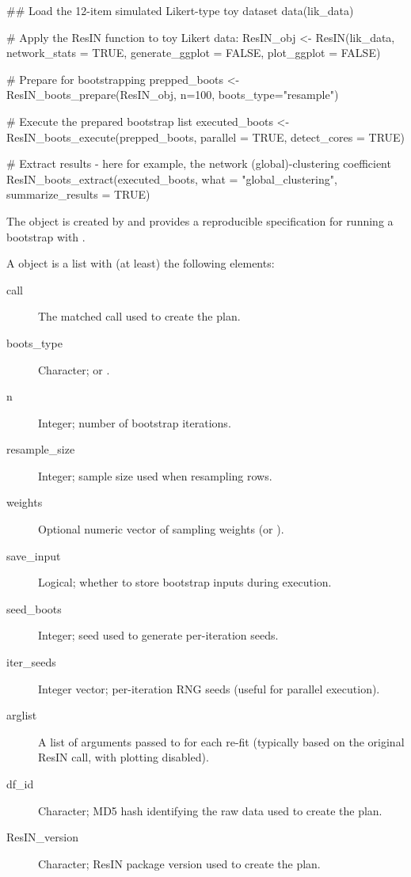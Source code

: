 \documentclass[a4paper]{book}
\begin{document}
\begin{Examples}
\begin{ExampleCode}
## Load the 12-item simulated Likert-type toy dataset
data(lik_data)

# Apply the ResIN function to toy Likert data:
ResIN_obj <- ResIN(lik_data, network_stats = TRUE,
                      generate_ggplot = FALSE, plot_ggplot = FALSE)


# Prepare for bootstrapping
prepped_boots <- ResIN_boots_prepare(ResIN_obj, n=100, boots_type="resample")

# Execute the prepared bootstrap list
executed_boots <-  ResIN_boots_execute(prepped_boots, parallel = TRUE, detect_cores = TRUE)

# Extract results - here for example, the network (global)-clustering coefficient
ResIN_boots_extract(executed_boots, what = "global_clustering", summarize_results = TRUE)


\end{ExampleCode}
\end{Examples}
%
\begin{Description}
The  object is created by
 and provides a reproducible specification
for running a bootstrap with .
\end{Description}
%
\begin{Details}
A  object is a list with (at least) the following elements:
\begin{description}

\item[call] The matched call used to create the plan.
\item[boots\_type] Character;  or .
\item[n] Integer; number of bootstrap iterations.
\item[resample\_size] Integer; sample size used when resampling rows.
\item[weights] Optional numeric vector of sampling weights (or ).
\item[save\_input] Logical; whether to store bootstrap inputs during execution.
\item[seed\_boots] Integer; seed used to generate per-iteration seeds.
\item[iter\_seeds] Integer vector; per-iteration RNG seeds (useful for parallel execution).
\item[arglist] A list of arguments passed to  for each re-fit
(typically based on the original ResIN call, with plotting disabled).
\item[df\_id] Character; MD5 hash identifying the raw data used to create the plan.
\item[ResIN\_version] Character; ResIN package version used to create the plan.

\end{description}

\end{Details}
\end{document}
